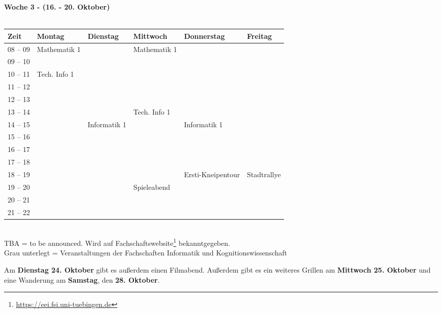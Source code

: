 \textbf{Woche 3 - (16. - 20. Oktober)}\\
\\
\begin{tabular}{|l|p{}|p{}|p{}|p{}|p{}|} \hline
	Zeit & Montag & Dienstag & Mittwoch & Donnerstag & Freitag \\ 
	\hline \hline
 08 -- 09 & \footnotesize{Mathematik 1} &                               & \footnotesize{Mathematik 1} & & \\ \cline{1-1}
 09 -- 10 &                             &                               &                             & & \\ \cline{1-2} \cline{4-4}
 10 -- 11 & \footnotesize{Tech. Info 1} &                               &                             & & \\ \cline{1-1} 
 11 -- 12 &                             &                               &                             & & \\ \cline{1-2}
 12 -- 13 &                             &                               &                             & & \\ \cline{1-1} \cline{4-4}
 13 -- 14 &                             &                               & \footnotesize Tech. Info 1  & & \\ 
    \cline{1-1} \cline{3-5}
 14 -- 15 &                             & \footnotesize{Informatik 1}   &                             & \footnotesize{Informatik 1} & \\  \cline {1-1}
 15 -- 16 &                             &                               &                             & & \\ 
  \cline{1-1} \cline{3-3} \cline{5-5}
 16 -- 17 & & & & & \\ \cline{1-1}
 17 -- 18 & & & & & \\ \cline{1-1} \cline{5-5}
 18 -- 19 & & & & \scriptsize{Ersti-Kneipentour} \cellcolor{lightlightgray}& \scriptsize{Stadtrallye} \cellcolor{lightlightgray}\\ \cline{1-1}
 19 -- 20 & & &\scriptsize{Spieleabend} \cellcolor{lightlightgray} & \cellcolor{lightlightgray} & \cellcolor{lightlightgray}\\ \cline{1-1}
 20 -- 21 & & &\cellcolor{lightlightgray} &  \cellcolor{lightlightgray}& \cellcolor{lightlightgray}\\ \cline{1-1}
 21 -- 22 & & &\cellcolor{lightlightgray} &  \cellcolor{lightlightgray}& \cellcolor{lightlightgray}\\ \hline
\end{tabular}
\\
{\scriptsize TBA = to be announced. Wird auf Fachschaftswebsite\footnote{\url{https://eei.fsi.uni-tuebingen.de}}  bekanntgegeben.} \\
{\scriptsize Grau unterlegt = Veranstaltungen der Fachschaften Informatik und Kognitionswissenschaft }

\normalsize
Am \textbf{Dienstag 24. Oktober} gibt es außerdem einen Filmabend. Außerdem gibt es ein weiteres Grillen am \textbf{Mittwoch 25. Oktober} und eine Wanderung am \textbf{Samstag}, den \textbf{28. Oktober}.

\newpage
\normalsize

